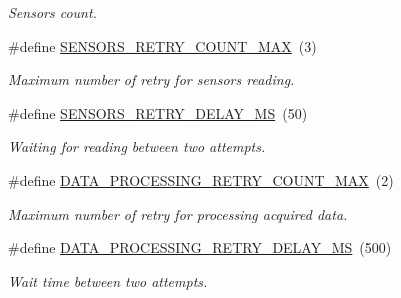 \begin{DoxyCompactItemize}
\begin{DoxyCompactList}\small\item\em Sensors count. \end{DoxyCompactList}\item 
\mbox{\label{rmap-config_8h_a16fa5577ef44bb1146f17a3bc43194b1}} 
\#define \hyperlink{rmap-config_8h_a16fa5577ef44bb1146f17a3bc43194b1}{S\+E\+N\+S\+O\+R\+S\+\_\+\+R\+E\+T\+R\+Y\+\_\+\+C\+O\+U\+N\+T\+\_\+\+M\+AX}~(3)
\begin{DoxyCompactList}\small\item\em Maximum number of retry for sensors reading. \end{DoxyCompactList}\item 
\mbox{\label{rmap-config_8h_a8ea8eeea7855628652f697bab3d173b5}} 
\#define \hyperlink{rmap-config_8h_a8ea8eeea7855628652f697bab3d173b5}{S\+E\+N\+S\+O\+R\+S\+\_\+\+R\+E\+T\+R\+Y\+\_\+\+D\+E\+L\+A\+Y\+\_\+\+MS}~(50)
\begin{DoxyCompactList}\small\item\em Waiting for reading between two attempts. \end{DoxyCompactList}\item 
\mbox{\label{rmap-config_8h_a7e36149c4e27cedef72823f8212b4fea}} 
\#define \hyperlink{rmap-config_8h_a7e36149c4e27cedef72823f8212b4fea}{D\+A\+T\+A\+\_\+\+P\+R\+O\+C\+E\+S\+S\+I\+N\+G\+\_\+\+R\+E\+T\+R\+Y\+\_\+\+C\+O\+U\+N\+T\+\_\+\+M\+AX}~(2)
\begin{DoxyCompactList}\small\item\em Maximum number of retry for processing acquired data. \end{DoxyCompactList}\item 
\mbox{\label{rmap-config_8h_a2933698b1b2aa94bf5755a89efbd05f7}} 
\#define \hyperlink{rmap-config_8h_a2933698b1b2aa94bf5755a89efbd05f7}{D\+A\+T\+A\+\_\+\+P\+R\+O\+C\+E\+S\+S\+I\+N\+G\+\_\+\+R\+E\+T\+R\+Y\+\_\+\+D\+E\+L\+A\+Y\+\_\+\+MS}~(500)
\begin{DoxyCompactList}\small\item\em Wait time between two attempts. \end{DoxyCompactList}\item 
\mbox{\label{rmap-config_8h_a81ed8eac7c6867ba31602628402f97c1}} 

\end{DoxyCompactItemize}

